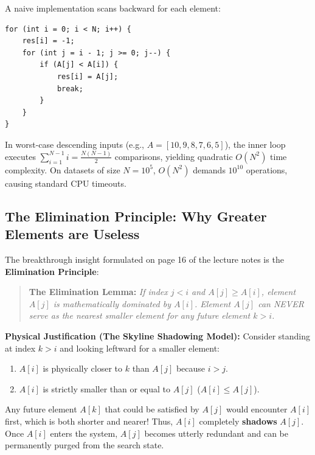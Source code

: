\documentclass[10pt,journal,compsoc,onecolumn]{IEEEtran}
\begin{document}
A naive implementation scans backward for each element:
\begin{verbatim}
for (int i = 0; i < N; i++) {
    res[i] = -1;
    for (int j = i - 1; j >= 0; j--) {
        if (A[j] < A[i]) {
            res[i] = A[j];
            break;
        }
    }
}
\end{verbatim}
In worst-case descending inputs (e.g., $A = [10, 9, 8, 7, 6, 5]$), the inner loop executes $\sum_{i=1}^{N-1} i = \frac{N(N-1)}{2}$ comparisons, yielding quadratic $O(N^2)$ time complexity. On datasets of size $N = 10^5$, $O(N^2)$ demands $10^{10}$ operations, causing standard CPU timeouts.

\subsection{The Elimination Principle: Why Greater Elements are Useless}

The breakthrough insight formulated on page 16 of the lecture notes is the \textbf{Elimination Principle}:
\begin{quote}
\textbf{The Elimination Lemma:} \emph{If index $j < i$ and $A[j] \ge A[i]$, element $A[j]$ is mathematically dominated by $A[i]$. Element $A[j]$ can NEVER serve as the nearest smaller element for any future element $k > i$.}
\end{quote}

\textbf{Physical Justification (The Skyline Shadowing Model):}
Consider standing at index $k > i$ and looking leftward for a smaller element:
\begin{enumerate}
    \item $A[i]$ is physically closer to $k$ than $A[j]$ because $i > j$.
    \item $A[i]$ is strictly smaller than or equal to $A[j]$ ($A[i] \le A[j]$).
\end{enumerate}
Any future element $A[k]$ that could be satisfied by $A[j]$ would encounter $A[i]$ first, which is both shorter and nearer! Thus, $A[i]$ completely \textbf{shadows} $A[j]$. Once $A[i]$ enters the system, $A[j]$ becomes utterly redundant and can be permanently purged from the search state.
\end{document}
